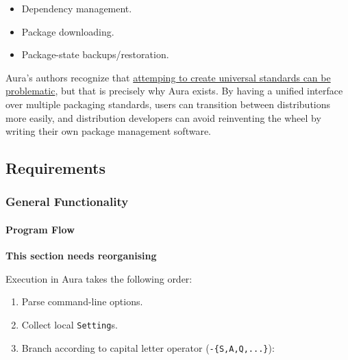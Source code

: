 \documentclass{article}
\begin{document}
\begin{itemize}
\itemsep1pt\parskip0pt
\item
  Dependency management.
\item
  Package downloading.
\item
  Package-state backups/restoration.
\end{itemize}

Aura's authors recognize that \href{http://www.xkcd.com/927/}{attemping
to create universal standards can be problematic}, but that is precisely
why Aura exists. By having a unified interface over multiple packaging
standards, users can transition between distributions more easily, and
distribution developers can avoid reinventing the wheel by writing their
own package management software.

\subsection{Requirements}\label{requirements}

\subsubsection{General Functionality}\label{general-functionality}

\paragraph{Program Flow}\label{program-flow}

\textbf{This section needs reorganising}

Execution in Aura takes the following order:

\begin{enumerate}
\def\labelenumi{\arabic{enumi}.}
\itemsep1pt\parskip0pt
\item
  Parse command-line options.
\item
  Collect local \texttt{Setting}s.
\item
  Branch according to capital letter operator (\texttt{-\{S,A,Q,...\}}):
\end{enumerate}
\end{document}
